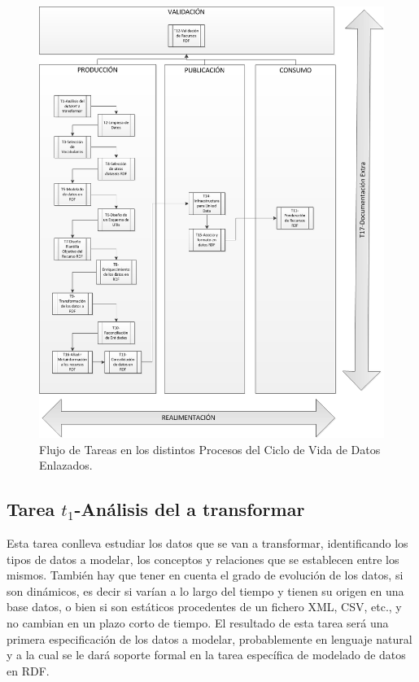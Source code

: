 \begin{figure}[!htp]
    \centering
	\includegraphics[width=16cm]{images/phd/modelo/flujo-tareas}
	\caption{Flujo de Tareas en los distintos Procesos del Ciclo de Vida de Datos Enlazados.}
	\label{fig:flujo-tareas-procesos}
\end{figure}


\subsection{Tarea $t_1$-Análisis del \dataset a transformar}
Esta tarea conlleva estudiar los datos que se van a transformar, identificando los tipos
de datos a modelar, los conceptos y relaciones que se establecen entre los mismos. También 
hay que tener en cuenta el grado de evolución de los datos, si son dinámicos, es decir si varían a lo largo del tiempo y tienen su 
origen en una base datos, o bien si son estáticos procedentes de un fichero \gls{XML}, \gls{CSV}, etc., y no cambian en un plazo corto de tiempo. 
El resultado de esta tarea será una primera especificación de los datos a modelar, probablemente en lenguaje natural y a 
la cual se le dará soporte formal en la tarea específica de modelado de datos en \gls{RDF}.

